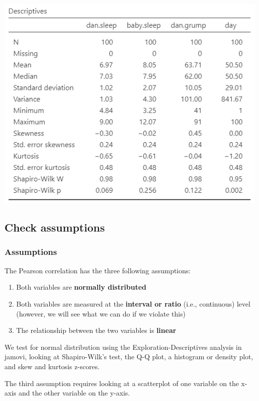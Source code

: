 \documentclass[
]{book}
\begin{document}
\includegraphics{images/08-correlation/correlation-descriptives.png}

\hypertarget{check-assumptions-6}{%
\subsection{Check assumptions}\label{check-assumptions-6}}

\hypertarget{assumptions-6}{%
\subsubsection{Assumptions}\label{assumptions-6}}

The Pearson correlation has the three following assumptions:

\begin{enumerate}
\def\labelenumi{\arabic{enumi}.}
\item
  Both variables are \textbf{normally distributed}
\item
  Both variables are measured at the \textbf{interval or ratio} (i.e., continuous) level (however, we will see what we can do if we violate this)
\item
  The relationship between the two variables is \textbf{linear}
\end{enumerate}

We test for normal distribution using the Exploration-Descriptives analysis in jamovi, looking at Shapiro-Wilk's test, the Q-Q plot, a histogram or density plot, and skew and kurtosis z-scores.

The third assumption requires looking at a scatterplot of one variable on the x-axis and the other variable on the y-axis.
\end{document}
